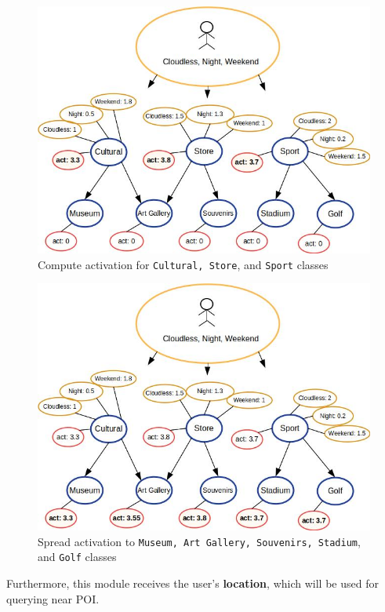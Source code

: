 \begin{figure}[h]
\centering
\includegraphics[scale=0.45]{draws/high_act.jpg}
\caption{Compute activation for {\tt Cultural, Store}, and {\tt Sport} classes}
\label{fig:high_act}
\end{figure}

\begin{figure}[h]
\centering
\includegraphics[scale=0.45]{draws/spread_act.jpg}
\caption{Spread activation to {\tt Museum, Art Gallery, Souvenirs, Stadium}, and {\tt Golf} classes}
\label{fig:spread_act}
\end{figure}

Furthermore, this module receives the user's \textbf{location}, which will be used for querying near POI.

